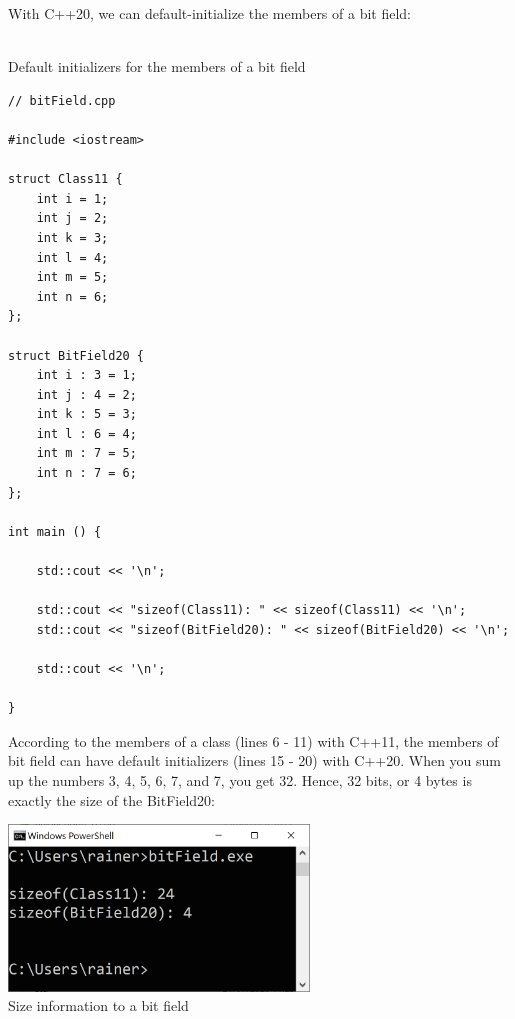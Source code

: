 With C++20, we can default-initialize the members of a bit field:

\hspace*{\fill} \\ %
\noindent
Default initializers for the members of a bit field
\begin{lstlisting}[style=styleCXX]
// bitField.cpp

#include <iostream>

struct Class11 {
	int i = 1;
	int j = 2;
	int k = 3;
	int l = 4;
	int m = 5;
	int n = 6;
};

struct BitField20 {
	int i : 3 = 1;
	int j : 4 = 2;
	int k : 5 = 3;
	int l : 6 = 4;
	int m : 7 = 5;
	int n : 7 = 6;
};

int main () {
	
	std::cout << '\n';
	
	std::cout << "sizeof(Class11): " << sizeof(Class11) << '\n';
	std::cout << "sizeof(BitField20): " << sizeof(BitField20) << '\n';
	
	std::cout << '\n';

}
\end{lstlisting}

According to the members of a class (lines 6 - 11) with C++11, the members of bit field can have default initializers (lines 15 - 20) with C++20. When you sum up the numbers 3, 4, 5, 6, 7, and 7, you get 32. Hence, 32 bits, or 4 bytes is exactly the size of the BitField20:

\begin{center}
\includegraphics[width=0.6\textwidth]{content/3/chapter4/images/49.png}\\
Size information to a bit field
\end{center}

